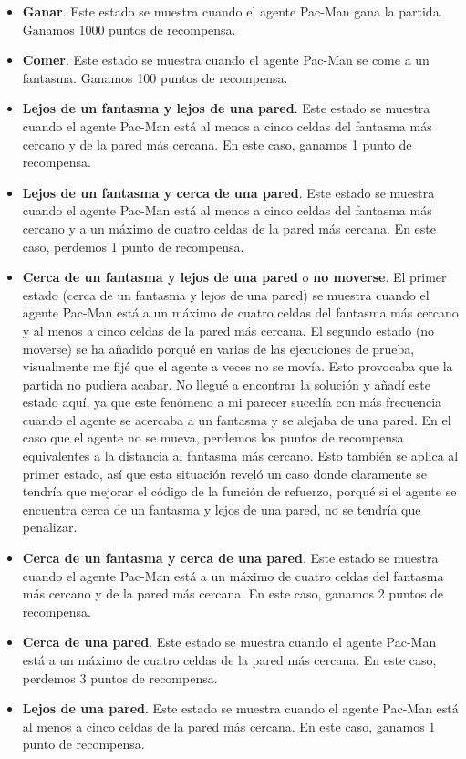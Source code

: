 \documentclass[11pt]{exam}
\begin{document}
\begin{itemize}
	\item \textbf{Ganar}. Este estado se muestra cuando el agente Pac-Man gana la partida. Ganamos 1000 puntos de recompensa.
	
	\item \textbf{Comer}. Este estado se muestra cuando el agente Pac-Man se come a un fantasma. Ganamos 100 puntos de recompensa.
	
	\item \textbf{Lejos de un fantasma y lejos de una pared}. Este estado se muestra cuando el agente Pac-Man está al menos a cinco celdas del fantasma más cercano y de la pared más cercana. En este caso, ganamos 1 punto de recompensa.
	
	\item \textbf{Lejos de un fantasma y cerca de una pared}. Este estado se muestra cuando el agente Pac-Man está al menos a cinco celdas del fantasma más cercano y a un máximo de cuatro celdas de la pared más cercana. En este caso, perdemos 1 punto de recompensa.
	
	\item \textbf{Cerca de un fantasma y lejos de una pared} o \textbf{no moverse}. El primer estado (cerca de un fantasma y lejos de una pared) se muestra cuando el agente Pac-Man está a un máximo de cuatro celdas del fantasma más cercano y al menos a cinco celdas de la pared más cercana. El segundo estado (no moverse) se ha añadido porqué en varias de las ejecuciones de prueba, visualmente me fijé que el agente a veces no se movía. Esto provocaba que la partida no pudiera acabar. No llegué a encontrar la solución y añadí este estado aquí, ya que este fenómeno a mi parecer sucedía con más frecuencia cuando el agente se acercaba a un fantasma y se alejaba de una pared. En el caso que el agente no se mueva, perdemos los puntos de recompensa equivalentes a la distancia al fantasma más cercano. Esto también se aplica al primer estado, así que esta situación reveló un caso donde claramente se tendría que mejorar el código de la función de refuerzo, porqué si el agente se encuentra cerca de un fantasma y lejos de una pared, no se tendría que penalizar.
	
	\item \textbf{Cerca de un fantasma y cerca de una pared}. Este estado se muestra cuando el agente Pac-Man está a un máximo de cuatro celdas del fantasma más cercano y de la pared más cercana. En este caso, ganamos 2 puntos de recompensa.
	
	\item \textbf{Cerca de una pared}. Este estado se muestra cuando el agente Pac-Man está a un máximo de cuatro celdas de la pared más cercana. En este caso, perdemos 3 puntos de recompensa.
	
	\item \textbf{Lejos de una pared}. Este estado se muestra cuando el agente Pac-Man está al menos a cinco celdas de la pared más cercana. En este caso, ganamos 1 punto de recompensa.
\end{itemize}
\end{document}

